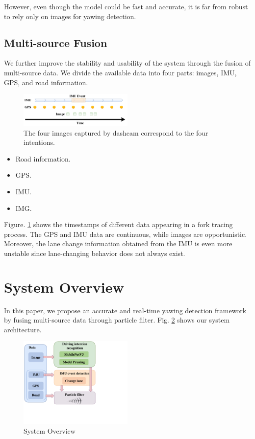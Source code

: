 \documentclass[journal]{IEEEtran}
\begin{document}
However, even though the model could be fast and accurate, it is far from robust to rely only on images for yawing detection.

\subsection{Multi-source Fusion}
We further improve the stability and usability of the system through the fusion of multi-source data. We divide the available data into four parts: images, IMU, GPS, and road information.

\begin{figure}[htbp]
    \centerline{\includegraphics[width=0.5\textwidth]{fig/data_freq.pdf}}
    \caption{The four images captured by dashcam correspond to the four intentions. }
    \label{fig:data_freq}
\end{figure}
\begin{itemize}
    \item Road information.
    \item GPS.
    \item IMU.
    \item IMG.
\end{itemize}

Figure. \ref{fig:data_freq} shows the timestamps of different data appearing in a fork tracing process. The GPS and IMU data are continuous, while images are opportunistic. Moreover, the lane change information obtained from the IMU is even more unstable since lane-changing behavior does not always exist. 

\section{System Overview}\label{sec:overview}
In this paper, we propose an accurate and real-time yawing detection framework by fusing multi-source data through particle filter. 
Fig. \ref{fig:SystemOverview} shows our system architecture.

\begin{figure}[htbp]
    \centerline{\includegraphics[width=0.5\textwidth]{fig/SystemOverview1.pdf}}
    \caption{System Overview}
    \label{fig:SystemOverview}
\end{figure}
\end{document}
